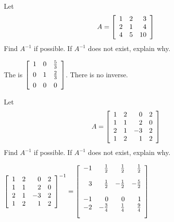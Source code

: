 \begin{enumialphparenastyle}
\begin{ex}Let
\begin{equation*}
A=\left[
\begin{array}{rrr}
1 & 2 & 3 \\
2 & 1 & 4 \\
4 & 5 & 10
\end{array}
\right] 
\end{equation*}
Find $A^{-1}$ if possible. If $A^{-1}$ does not exist, explain why. 
\begin{sol}
The {\rref} is 
$\leftB
\begin{array}{ccc}
1 & 0 & \vspace{0.05in}\frac{5}{3} \\
0 & 1 & \vspace{0.05in}\frac{2}{3} \\
0 & 0 & 0
\end{array}
\rightB$. There is no inverse.
\end{sol}
\end{ex}

\begin{ex}Let
\begin{equation*}
A=\left[
\begin{array}{rrrr}
1 & 2 & 0 & 2 \\
1 & 1 & 2 & 0 \\
2 & 1 & -3 & 2 \\
1 & 2 & 1 & 2
\end{array}
\right]
\end{equation*}
Find $A^{-1}$ if possible. If $A^{-1}$ does not exist, explain why.
\begin{sol}
$\leftB
\begin{array}{rrrr}
1 & 2 & 0 & 2 \\
1 & 1 & 2 & 0 \\
2 & 1 & -3 & 2 \\
1 & 2 & 1 & 2
\end{array}
\rightB^{-1}= \leftB
\begin{array}{rrrr}
-1 & \vspace{0.05in}\frac{1}{2} &  \vspace{0.05in}\frac{1}{2} &  \vspace{0.05in}\frac{1}{2} \\
3 &  \vspace{0.05in}\frac{1}{2} & - \vspace{0.05in}\frac{1}{2} & - \vspace{0.05in}\frac{5}{2} \\
-1 & 0 & 0 & 1 \\
-2 & - \vspace{0.05in}\frac{3}{4} &  \vspace{0.05in}\frac{1}{4} &  \vspace{0.05in}\frac{9}{4}
\end{array}
\rightB$
\end{sol}
\end{ex}


\end{enumialphparenastyle}

